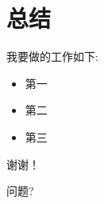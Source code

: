 \section{总结}
\begin{frame}{\insertsection}
	我要做的工作如下:
	\vspace{1em}
	\begin{itemize}
		\setlength\itemsep{1em}
		\item 第一
		\item 第二
		\item 第三
	\end{itemize}	
\end{frame}
\begin{frame}
	\begin{figure}
		\centering
		\resizebox{1.0\textwidth}{!}{}
	\end{figure}
\end{frame}
\begin{frame}%
	\begin{center}
		{\fontsize{40}{50}\selectfont 谢谢！}
	\end{center}
		\begin{center}
			{\fontsize{40}{50}\selectfont 问题?}
		\end{center}
\end{frame}
